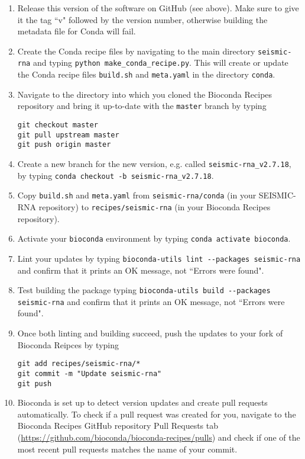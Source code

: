 \documentclass[main.tex]{subfiles}
\begin{document}
\begin{enumerate}
    \item Release this version of the software on GitHub (see above). Make sure to give it the tag ``v" followed by the version number, otherwise building the metadata file for Conda will fail.
    \item Create the Conda recipe files by navigating to the main directory \verb|seismic-rna| and typing \verb|python make_conda_recipe.py|. This will create or update the Conda recipe files \verb|build.sh| and \verb|meta.yaml| in the directory \verb|conda|.
    \item Navigate to the directory into which you cloned the Bioconda Recipes repository and bring it up-to-date with the \verb|master| branch by typing
        \begin{verbatim}
git checkout master
git pull upstream master
git push origin master
        \end{verbatim}
    \item Create a new branch for the new version, e.g. called \verb|seismic-rna_v2.7.18|, by typing \verb|conda checkout -b seismic-rna_v2.7.18|.
    \item Copy \verb|build.sh| and \verb|meta.yaml| from \verb|seismic-rna/conda| (in your SEISMIC-RNA repository) to \verb|recipes/seismic-rna| (in your Bioconda Recipes repository).
    \item Activate your \verb|bioconda| environment by typing \verb|conda activate bioconda|.
    \item Lint your updates by typing \verb|bioconda-utils lint --packages seismic-rna| and confirm that it prints an OK message, not ``Errors were found".
    \item Test building the package typing \verb|bioconda-utils build --packages seismic-rna| and confirm that it prints an OK message, not ``Errors were found".
    \item Once both linting and building succeed, push the updates to your fork of Bioconda Reipces by typing
    	\begin{verbatim}
git add recipes/seismic-rna/*
git commit -m "Update seismic-rna"
git push
        \end{verbatim}
    \item Bioconda is set up to detect version updates and create pull requests automatically. To check if a pull request was created for you, navigate to the Bioconda Recipes GitHub repository Pull Requests tab (\url{https://github.com/bioconda/bioconda-recipes/pulls}) and check if one of the most recent pull requests matches the name of your commit.

\end{enumerate}
\end{document}
